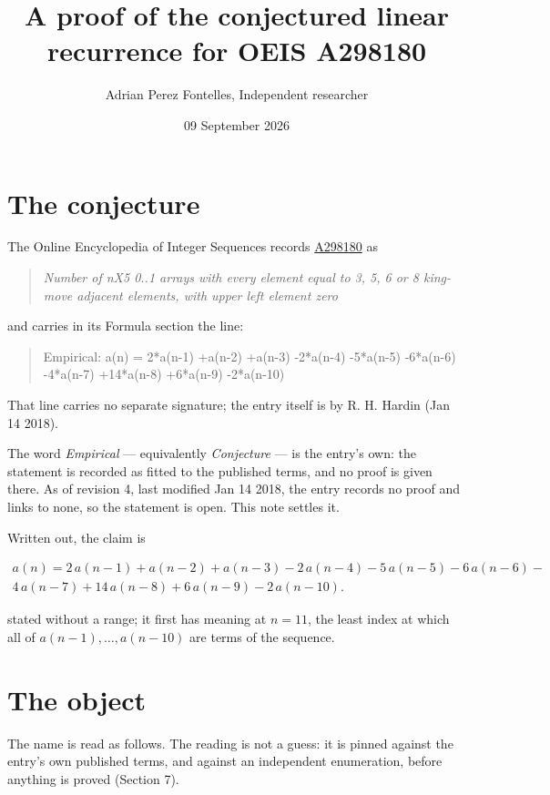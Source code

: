 \documentclass[11pt]{article}
\title{A proof of the conjectured linear recurrence for OEIS A298180}
\author{Adrian Perez Fontelles, Independent researcher}
\date{09 September 2026}
\theoremstyle{definition}
\begin{document}
\maketitle
\section{The conjecture}

The Online Encyclopedia of Integer Sequences records \href{https://oeis.org/A298180}{A298180} as

\begin{quote}\itshape Number of nX5 0..1 arrays with every element equal to 3, 5, 6 or 8 king-move adjacent elements, with upper left element zero\end{quote}

and carries in its Formula section the line:

\begin{quote}\ttfamily Empirical: a(n) = 2*a(n-1) +a(n-2) +a(n-3) -2*a(n-4) -5*a(n-5) -6*a(n-6) -4*a(n-7) +14*a(n-8) +6*a(n-9) -2*a(n-10)\end{quote}

That line carries no separate signature; the entry itself is by R. H. Hardin (Jan 14 2018).

The word {\itshape Empirical} --- equivalently {\itshape Conjecture} --- is the entry's own: the statement is recorded as fitted to the published terms, and no proof is given there. As of revision 4, last modified Jan 14 2018, the entry records no proof and links to none, so the statement is open. This note settles it.

Written out, the claim is

\begin{multline*} a(n) = 2\,a(n-1) + a(n-2) + a(n-3) - 2\,a(n-4) - 5\,a(n-5) - 6\,a(n-6) - \\ 4\,a(n-7) + 14\,a(n-8) + 6\,a(n-9) - 2\,a(n-10). \end{multline*}

stated without a range; it first has meaning at $n = 11$, the least index at which all of $a(n-1),\dots,a(n-10)$ are terms of the sequence.

\section{The object}

The name is read as follows. The reading is not a guess: it is pinned against the entry's own published terms, and against an independent enumeration, before anything is proved (Section 7).
\end{document}
